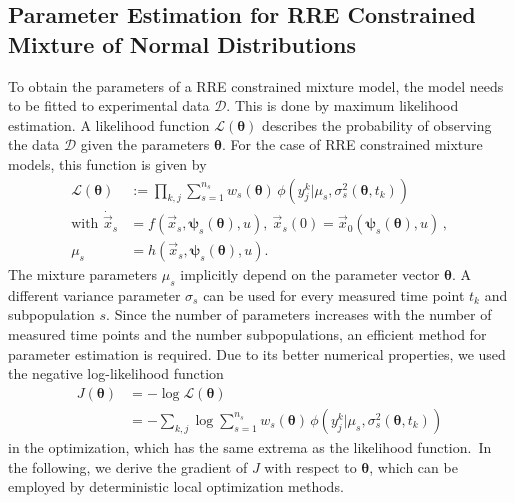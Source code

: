 \documentclass{llncs}
\newcommand{\x}{\vec{x}}
\newcommand{\vtheta}{\boldsymbol{\theta}}
\newcommand{\vpsi}{\boldsymbol{\psi}}
\begin{document}
\subsection{Parameter Estimation for RRE Constrained Mixture of Normal Distributions}
To obtain the parameters of a RRE constrained mixture model, the model needs to be fitted to experimental data $\mathcal{D}$. This is done by maximum likelihood estimation. A likelihood function 
$\mathcal{L}(\vtheta)$ describes the probability of observing the data $\mathcal{D}$ given the parameters $\vtheta$. For the case of RRE constrained mixture models, this function is given by
\begin{align*}
\mathcal{L}(\vtheta) &:= \prod_{k,j} \sum_{s=1}^{n_s} w_s(\vtheta)\,\phi\left(y_j^{k}|\mu_s, \sigma_{s}^2(\vtheta,t_k)\right) \\
\mbox{with } \dot{\x}_s &= f\left(\x_s, \vpsi_s(\vtheta), u\right),~\x_s(0) = \x_{0}(\vpsi_s(\vtheta), u)\,, \\ 
\mu_s &= h\left(\x_s, \boldsymbol{\psi}_s(\vtheta), u\right). 
\end{align*}
The mixture parameters $\mu_s$ implicitly depend on the parameter vector $\vtheta$. A different variance parameter $\sigma_{s}$ can be used for every measured time point $t_k$ and subpopulation $s$. Since the number of parameters increases with the number of measured time points and the number subpopulations, an efficient method for parameter estimation is required. Due to its better numerical properties, we used the negative log-likelihood function 
\begin{align*}
J(\vtheta) &= -\log\mathcal{L}\left(\vtheta\right)\\
&= -\sum_{k,j}\log\sum_{s=1}^{n_s}w_s(\vtheta)\,\phi\left(y_j^{k}|\mu_s, \sigma_{s}^2(\vtheta,t_k)\right)
\end{align*}
in the optimization, \color{revcol}which has the same extrema as the likelihood function.\color{black}~In the following, we derive the gradient of $J$ with respect to $\vtheta$, which can be employed by deterministic local optimization methods.
\end{document}
